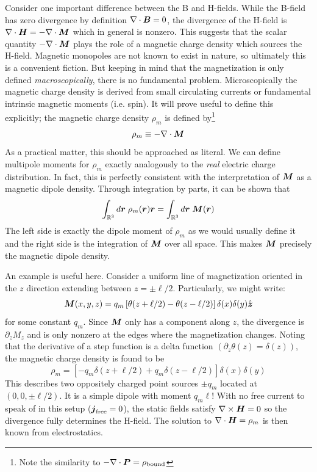 \documentclass[twocolumn]{gwclass}
\newcommand{\R}{\mathbb{R}}
\begin{document}
	Consider one important difference between the B and H-fields. While the B-field has zero divergence by definition $\nabla\cdot\boldsymbol{B}=0$, the divergence of the H-field is $ \nabla\cdot\boldsymbol{H} = -\nabla\cdot\boldsymbol{M} $ which in general is nonzero. This suggests that the scalar quantity $-\nabla\cdot\boldsymbol{M}$ plays the role of a magnetic charge density which sources the H-field. Magnetic monopoles are not known to exist in nature, so ultimately this is a convenient fiction. But keeping in mind that the magnetization is only defined \emph{macroscopically}, there is no fundamental problem. Microscopically the magnetic charge density is derived from small circulating currents or fundamental intrinsic magnetic moments (i.e. spin). It will prove useful to define this explicitly; the magnetic charge density $\rho_m$ is defined by\footnote{Note the similarity to $-\nabla\cdot\boldsymbol{P}= \rho_{\text{\normalfont{bound}}}$}
	$$ \rho_m \equiv -\nabla\cdot\boldsymbol{M} $$
	As a practical matter, this should be approached as literal. We can define multipole moments for $\rho_m$ exactly analogously to the \emph{real} electric charge distribution. In fact, this is perfectly consistent with the interpretation of $\boldsymbol{M}$ as a magnetic dipole density. Through integration by parts, it can be shown that
	$$  \int_{\R^3}d\*r\;\rho_m(\*r)\*r = \int_{\R^3}d\*r\;\*M(\*r)  $$
	The left side is exactly the dipole moment of $\rho_m$ as we would usually define it and the right side is the integration of $\boldsymbol{M}$ over all space. This makes $\boldsymbol{M}$ precisely the magnetic dipole density.
	
	An example is useful here. Consider a uniform line of magnetization oriented in the $z$ direction extending between $z=\pm\ell/2$. Particularly, we might write:
	$$ \boldsymbol{M}(x,y,z) = q_m\left[\theta(z + \ell/2) - \theta(z -\ell/2)\right]\delta(x)\delta(y)\hat{\boldsymbol{z}} $$
	for some constant $q_m$. Since $\boldsymbol{M}$ only has a component along $z$, the divergence is $\partial_z M_z$ and is only nonzero at the edges where the magnetization changes. Noting that the derivative of a step function is a delta function $(\partial_z\theta(z) = \delta(z))$, the magnetic charge density is found to be
	$$ \rho_m = [-q_m\delta(z+\ell/2) + q_m\delta(z-\ell/2)]\delta(x)\delta(y) $$
	This describes two oppositely charged point sources $\pm q_m$ located at $(0,0,\pm\ell/2)$. It is a simple dipole with moment $q_m\ell$! With no free current to speak of in this setup ($\boldsymbol{j}_{\text{\normalfont{free}}}=0$), the static fields satisfy $\nabla\times\boldsymbol{H}=0$ so the divergence fully determines the H-field. The solution to $\nabla\cdot\boldsymbol{H}=\rho_m$ is then known from electrostatics.
	
\end{document}
